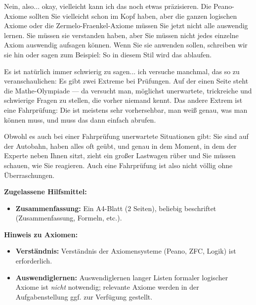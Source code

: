 \begin{spoken-clean}[01:16:42 - 01:18:09]
Nein, also... okay, vielleicht kann ich das noch etwas präzisieren. Die Peano-Axiome sollten Sie vielleicht schon im Kopf haben, aber die ganzen logischen Axiome oder die Zermelo-Fraenkel-Axiome müssen Sie jetzt nicht alle auswendig lernen. Sie müssen sie verstanden haben, aber Sie müssen nicht jedes einzelne Axiom auswendig aufsagen können. Wenn Sie sie anwenden sollen, schreiben wir sie hin oder sagen zum Beispiel:  So in diesem Stil wird das ablaufen.

Es ist natürlich immer schwierig zu sagen... ich versuche manchmal, das so zu veranschaulichen: Es gibt zwei Extreme bei Prüfungen. Auf der einen Seite steht die Mathe-Olympiade --- da versucht man, möglichst unerwartete, trickreiche und schwierige Fragen zu stellen, die vorher niemand kennt. Das andere Extrem ist eine Fahrprüfung: Die ist meistens sehr vorhersehbar, man weiß genau, was man können muss, und muss das dann einfach abrufen. 

Obwohl es auch bei einer Fahrprüfung unerwartete Situationen gibt: Sie sind auf der Autobahn, haben alles oft geübt, und genau in dem Moment, in dem der Experte neben Ihnen sitzt, zieht ein großer Lastwagen rüber und Sie müssen schauen, wie Sie reagieren. Auch eine Fahrprüfung ist also nicht völlig ohne Überraschungen.
\end{spoken-clean}

\begin{math-stroke}
\textbf{Zugelassene Hilfsmittel:}
\begin{itemize}
    \item \textbf{Zusammenfassung:} Ein A4-Blatt (2 Seiten), beliebig beschriftet (Zusammenfassung, Formeln, etc.).
\end{itemize}

\textbf{Hinweis zu Axiomen:}
\begin{itemize}
    \item \textbf{Verständnis:} Verständnis der Axiomensysteme (Peano, ZFC, Logik) ist erforderlich.
    \item \textbf{Auswendiglernen:} Auswendiglernen langer Listen formaler logischer Axiome ist \emph{nicht} notwendig; relevante Axiome werden in der Aufgabenstellung ggf. zur Verfügung gestellt.
\end{itemize}
\end{math-stroke}

